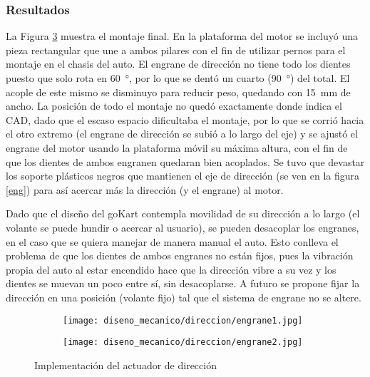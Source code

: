 \subsubsection{Resultados}

La Figura \ref{engraneFinal} muestra el montaje final. En la plataforma del motor se incluyó una pieza rectangular que une a ambos pilares con el fin de utilizar pernos para el montaje en el chasis del auto. El engrane de dirección no tiene todo los dientes puesto que solo rota en \SI{60}{\degree}, por lo que se dentó un cuarto (\SI{90}{\degree}) del total. El acople de este mismo se disminuyo para reducir peso, quedando con \SI{15}{\milli\meter} de ancho. La posición de todo el montaje no quedó exactamente donde indica el CAD, dado que el escaso espacio dificultaba el montaje, por lo que se corrió hacia el otro extremo (el engrane de dirección se subió a lo largo del eje) y se ajustó el engrane del motor usando la plataforma móvil su máxima altura, con el fin de que los dientes de ambos engranen quedaran bien acoplados. Se tuvo que devastar los soporte plásticos negros que mantienen el eje de dirección (se ven en la figura \ref{eng}) para así acercar más la dirección (y el engrane) al motor.

Dado que el diseño del goKart contempla movilidad de su dirección a lo largo (el volante se puede hundir o acercar al usuario), se pueden desacoplar los engranes, en el caso que se quiera manejar de manera manual el auto. Esto conlleva el problema de que los dientes de ambos engranes no están fijos, pues la vibración propia del auto al estar encendido hace que la dirección vibre a su vez y los dientes se muevan un poco entre sí, sin desacoplarse. A futuro se propone fijar la dirección en una posición (volante fijo) tal que el sistema de engrane no se altere.

\begin{figure}[H]
\begin{center}
    \begin{subfigure}{0.4\textwidth}
        \texttt{[image: diseno\_mecanico/direccion/engrane1.jpg]} 
        \label{sw1}
    \end{subfigure}
    \begin{subfigure}{0.4\textwidth}
        \texttt{[image: diseno\_mecanico/direccion/engrane2.jpg]}
        \label{sw2}
    \end{subfigure}
    \caption{Implementación del actuador de dirección}
    \label{engraneFinal}
\end{center}
\end{figure}


